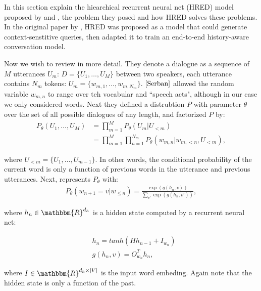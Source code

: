 In this section explain the hiearchical recurrent neural net (HRED) model proposed by \cite{Serban} and \cite{Sordoni}, the problem they posed and how HRED solves these problems. In the original paper by \cite{Sordini}, HRED was proposed as a model that could generate context-senstitive queries, then \cite{Serban} adapted it to train an end-to-end history-aware conversation model.

Now we wish to review \cite{Serban} in more detail. They denote a dialogue as a sequence of $M$ utterances $U_m$: $D = \{U_1, \ldots, U_M\}$ between two speakers, each utterance contains $N_m$ tokens: $U_m = \{w_{m,1},\ldots,w_{m,N_m}\}$. $\cite{Serban}$ allowed the random variable $w_{m,n}$ to range over teh vocabular and ``speech acts", although in our case we only considered words. Next they defined a distrubtion $P$ with parameter $\theta$ over the set of all possible dialogues of any length, and factorized $P$ by:
    \begin{align*}
        P_{\theta}(U_1, \ldots, U_M) &= \prod_{m=1}^M P_{\theta}(U_m | U_{<m}) \\
                                     &= \prod_{m=1}^M \prod_{n=1}^{N_m} P_{\theta} (w_{m,n}|w_{m,<n}, U_{<m}),
    \end{align*}

where $U_{<m} = \{U_1, \ldots, U_{m-1}\}$. In other words, the conditional probability of the current word is only a function of previous words in the utterance and previous utterances. Next, \cite{Serban} represents $P_{\theta}$ with:
    \begin{align*}
        P_{\theta} (w_{n+1} = v | w_{\leq n}) = \frac{\exp(g(h_n,v))}{\sum_{v'} \exp(g(h_n, v'))},
    \end{align*}

where $h_n \in \mathbbm{R}^{d_h}$ is a hidden state computed by a recurrent neural net:

    \begin{align*}
        &h_n = tanh (H h_{n-1} + I_{w_n}) \\
        &g(h_n, v) = O^{T}_{w_n} h_n,
    \end{align*}

where $I \in \mathbbm{R}^{d_h \times |V|}$ is the input word embeding. Again note that the hidden state is only a function of the past. 










